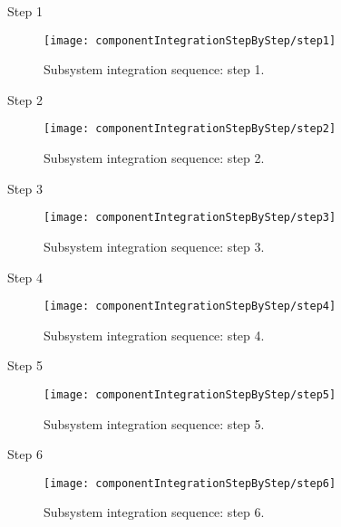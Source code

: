 	\begin{description}
	
	\item Step 1		
		\begin{figure}[H]
			\centering
			\texttt{[image: componentIntegrationStepByStep/step1]}
			\caption{Subsystem integration sequence: step 1.}
		\end{figure}
	
	\vfill
	\item Step 2
		\begin{figure}[H]
			\centering
			\texttt{[image: componentIntegrationStepByStep/step2]}
			\caption{Subsystem integration sequence: step 2.}
		\end{figure}
	
	\bigskip
	\item Step 3
		\begin{figure}[H]
			\centering
			\texttt{[image: componentIntegrationStepByStep/step3]}
			\caption{Subsystem integration sequence: step 3.}
		\end{figure}
		
	\bigskip
	\item Step 4
		\begin{figure}[H]
			\centering
			\texttt{[image: componentIntegrationStepByStep/step4]}
			\caption{Subsystem integration sequence: step 4.}
		\end{figure}
		
	\bigskip
	\item Step 5
		\begin{figure}[H]
			\centering
			\texttt{[image: componentIntegrationStepByStep/step5]}
			\caption{Subsystem integration sequence: step 5.}
		\end{figure}
		
	\bigskip	
	\item Step 6
		\begin{figure}[H]
			\centering
			\texttt{[image: componentIntegrationStepByStep/step6]}
			\caption{Subsystem integration sequence: step 6.}
		\end{figure}

	\end{description}
	
